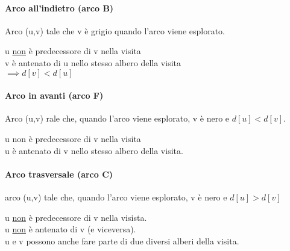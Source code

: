\paragraph*{Arco all'indietro (arco B)} \ra Arco (u,v) tale che v è grigio quando l'arco
viene esplorato.
\begin{center}
\end{center}
u \underline{non} è predecessore di v nella visita\\
v è antenato di u nello stesso albero della visita \\ $\implies d[v] < d[u]$
\paragraph*{Arco in avanti (arco F)} \ra Arco (u,v) rale che, quando l'arco viene esplorato,
v è nero e $d[u] < d[v]$.
\begin{center}
\end{center}
u non è predecessore di v nella visita\\
u è antenato di v nello stesso albero della visita.
\paragraph*{Arco trasversale (arco C)} \ra arco (u,v) tale che, quando l'arco viene esplorato,
v è nero e $d[u] > d[v]$
\begin{center}
\end{center}
u \underline{non} è predecessore di v nella visista.\\
u \underline{non} è antenato di v (e viceversa).\\
u e v possono anche fare parte di due diversi alberi della visita.
